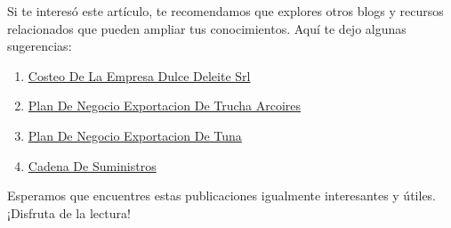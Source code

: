 \documentclass[
  stu,
  floatsintext,
  longtable,
  a4paper,
  nolmodern,
  notxfonts,
  notimes,
  12pt,
  colorlinks=true,linkcolor=blue,citecolor=blue,urlcolor=blue]{apa7}
\providecommand{\tightlist}{%
  \setlength{\itemsep}{0pt}\setlength{\parskip}{0pt}}
\begin{document}
Si te interesó este artículo, te recomendamos que explores otros blogs y
recursos relacionados que pueden ampliar tus conocimientos. Aquí te dejo
algunas sugerencias:

\begin{enumerate}
\def\labelenumi{\arabic{enumi}.}
\tightlist
\item
  \href{https://actus-mercator.netlify.app/posts/2017-10-23-costeo-de-la-empresa-dulce-deleite-srl/index.pdf}{}
  \href{https://actus-mercator.netlify.app/posts/2017-10-23-costeo-de-la-empresa-dulce-deleite-srl}{Costeo
  De La Empresa Dulce Deleite Srl}
\item
  \href{https://actus-mercator.netlify.app/posts/2020-09-15-plan-de-negocio-exportacion-de-trucha-arcoires/index.pdf}{}
  \href{https://actus-mercator.netlify.app/posts/2020-09-15-plan-de-negocio-exportacion-de-trucha-arcoires}{Plan
  De Negocio Exportacion De Trucha Arcoires}
\item
  \href{https://actus-mercator.netlify.app/posts/2021-07-13-plan-de-negocio-exportacion-de-tuna/index.pdf}{}
  \href{https://actus-mercator.netlify.app/posts/2021-07-13-plan-de-negocio-exportacion-de-tuna}{Plan
  De Negocio Exportacion De Tuna}
\item
  \href{https://actus-mercator.netlify.app/posts/2022-01-23-cadena-de-suministros/index.pdf}{}
  \href{https://actus-mercator.netlify.app/posts/2022-01-23-cadena-de-suministros}{Cadena
  De Suministros}
\end{enumerate}

Esperamos que encuentres estas publicaciones igualmente interesantes y
útiles. ¡Disfruta de la lectura!
\end{document}
